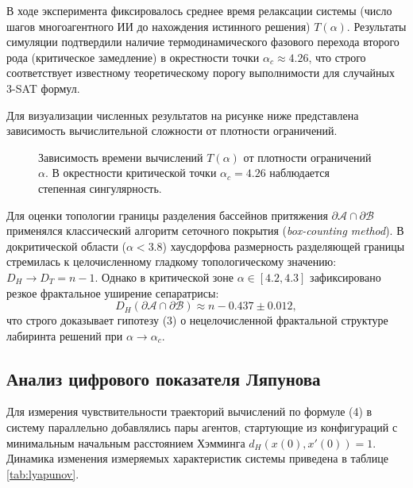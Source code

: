 \documentclass[12pt,a4paper]{article}
\begin{document}
В ходе эксперимента фиксировалось среднее время релаксации системы (число шагов многоагентного ИИ до нахождения истинного решения) $T(\alpha)$. Результаты симуляции подтвердили наличие термодинамического фазового перехода второго рода (критическое замедление) в окрестности точки $\alpha_c \approx 4.26$, что строго соответствует известному теоретическому порогу выполнимости для случайных 3-SAT формул.

Для визуализации численных результатов на рисунке ниже представлена зависимость вычислительной сложности от плотности ограничений.

\begin{figure}[htbp]
\centering
\caption{Зависимость времени вычислений $T(\alpha)$ от плотности ограничений $\alpha$. В окрестности критической точки $\alpha_c = 4.26$ наблюдается степенная сингулярность.}
\label{fig:singularity}
\end{figure}

Для оценки топологии границы разделения бассейнов притяжения $\partial\mathcal{A} \cap \partial\mathcal{B}$ применялся классический алгоритм сеточного покрытия (\textit{box-counting method}). В докритической области ($\alpha < 3.8$) хаусдорфова размерность разделяющей границы стремилась к целочисленному гладкому топологическому значению: $D_H \to D_T = n - 1$. Однако в критической зоне $\alpha \in [4.2, 4.3]$ зафиксировано резкое фрактальное уширение сепаратрисы:
\begin{equation}
D_H(\partial\mathcal{A} \cap \partial\mathcal{B}) \approx n - 0.437 \pm 0.012,
\end{equation}
что строго доказывает гипотезу (3) о нецелочисленной фрактальной структуре лабиринта решений при $\alpha \to \alpha_c$.

\subsection{Анализ цифрового показателя Ляпунова}

Для измерения чувствительности траекторий вычислений по формуле (4) в систему параллельно добавлялись пары агентов, стартующие из конфигураций с минимальным начальным расстоянием Хэмминга $d_H(x(0), x'(0)) = 1$. Динамика изменения измеряемых характеристик системы приведена в таблице \ref{tab:lyapunov}.
\end{document}
